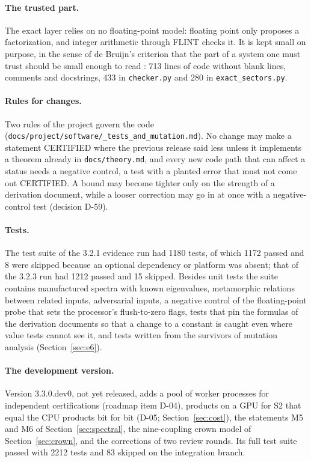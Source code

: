 \documentclass[11pt,a4paper]{article}
\newcommand{\code}[1]{\texttt{#1}}
\newcommand{\status}[1]{\textsf{#1}}
\newcommand{\CERT}{\status{CERTIFIED}}
\begin{document}
\paragraph{The trusted part.}
The exact layer relies on no floating-point model: floating point only proposes a factorization, and integer
arithmetic through FLINT \cite{FLINT} checks it. It is kept small on purpose, in the sense of de Bruijn's criterion
that the part of a system one must trust should be small enough to read \cite{BarendregtWiedijk2005}: 713 lines of
code without blank lines, comments and docstrings, 433 in \code{checker.py} and 280 in \code{exact\_sectors.py}.

\paragraph{Rules for changes.}
Two rules of the project govern the code
(\code{docs/\allowbreak project/\allowbreak software/\allowbreak 08\_tests\_and\_mutation.md}). No change may make a
statement \CERT{} where the previous release said less unless it implements a theorem already in \code{docs/theory.md},
and every new code path that can affect a status needs a negative control, a test with a planted error that must not
come out \CERT. A bound may become tighter only on the strength of a derivation document, while a looser correction may
go in at once with a negative-control test (decision D-59).

\paragraph{Tests.}
The test suite of the 3.2.1 evidence run had 1180 tests, of which 1172 passed and 8 were skipped because an optional
dependency or platform was absent; that of the 3.2.3 run had 1212 passed and 15 skipped. Besides unit tests the suite
contains manufactured spectra with known eigenvalues, metamorphic relations between related inputs, adversarial
inputs, a negative control of the floating-point probe that sets the processor's flush-to-zero flags, tests that pin
the formulas of the derivation documents so that a change to a constant is caught even where value tests cannot see
it, and tests written from the survivors of mutation analysis (Section~\ref{sec:e6}).

\paragraph{The development version.}
Version 3.3.0.dev0, not yet released, adds a pool of worker processes for independent certifications (roadmap item
D-04), products on a GPU for S2 that equal the CPU products bit for bit (D-05; Section~\ref{sec:cost}), the statements
M5 and M6 of Section~\ref{sec:spectral}, the nine-coupling crown model of Section~\ref{sec:crown}, and the corrections
of two review rounds. Its full test suite passed with 2212 tests and 83 skipped on the integration branch.
\end{document}
